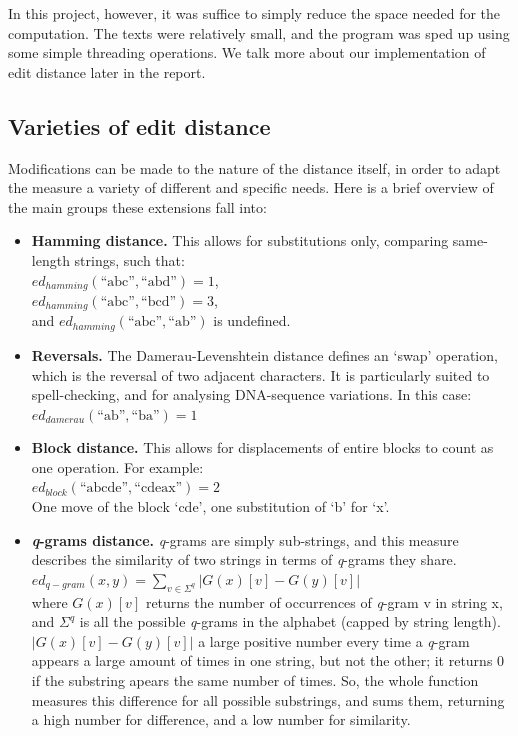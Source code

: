 In this project, however, it was suffice to simply reduce the space
needed for the computation. The texts were relatively small, and the
program was sped up using some simple threading operations. We talk
more about our implementation of edit distance later in the report. 

\subsection*{Varieties of edit distance}
Modifications can be made to the nature of the distance itself, in
order to adapt the measure a variety of different and specific
needs. Here is a brief overview of the main groups these extensions
fall into:

\begin{itemize}
\item \textbf{Hamming distance.} This allows for substitutions only,
  comparing same-length strings, such
  that:\\ $ed_{hamming}(\text{``abc''},\text{``abd''})
  =1$,\\ $ed_{hamming}(\text{``abc''},\text{``bcd''}) = 3$,\\ and
  $ed_{hamming}(\text{``abc''},\text{``ab''})$ is
  undefined.\cite{Hamming1950}
\item \textbf{Reversals.} The Damerau-Levenshtein distance defines an
  `swap' operation, which is the reversal of two adjacent
  characters. It is particularly suited to spell-checking, and for
  analysing DNA-sequence variations. In this
  case:\\ $ed_{damerau}(\text{``ab''},\text{``ba''}) = 1$
\item \textbf{Block distance.} This allows for displacements of entire
  blocks to count as one operation. For
  example:\\ $ed_{block}(\text{``abcde''},\text{``cdeax''})= 2$ \\ One
  move of the block `cde', one substitution of `b' for
  `x'.\cite{Tichy1984}
\item \textbf{\textit{q}-grams distance.} \textit{q}-grams are simply
  sub-strings, and this measure describes the similarity of two
  strings in terms of \textit{q}-grams they
  share.\cite{Ukkonen1992}\\ $ed_{q-gram}(x,y)=\sum\limits_{v\in\Sigma
    ^q}|G(x)[v]-G(y)[v]|$\\ where $G(x)[v]$ returns the number of
  occurrences of \textit{q}-gram v in string x, and $\Sigma ^q$ is all
  the possible \textit{q}-grams in the alphabet (capped by string
  length). $|G(x)[v]-G(y)[v]|$ a large positive number every time a
  \textit{q}-gram appears a large amount of times in one string, but
  not the other; it returns 0 if the substring apears the same number
  of times. So, the whole function measures this difference for all
  possible substrings, and sums them, returning a high number for
  difference, and a low number for similarity.
\end{itemize}

